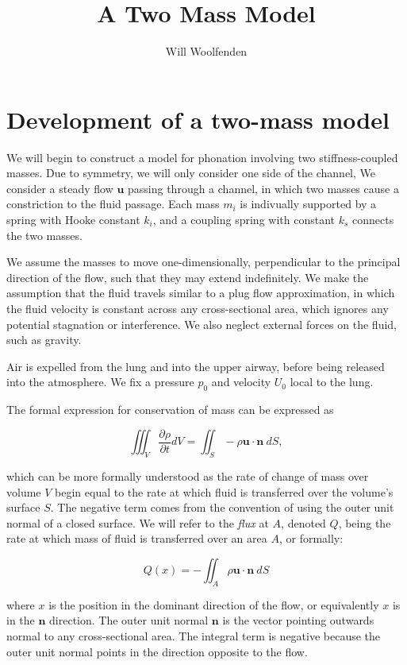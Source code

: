 \documentclass{article}
\begin{document}
\title{A Two Mass Model}
\author{Will Woolfenden}

\section{Development of a two-mass model}

We will begin to construct a model for phonation involving two stiffness-coupled masses.
Due to symmetry, we will only consider one side of the channel, 
We consider a steady flow $\mathbf{u}$ passing through a channel,
in which two masses cause a constriction to the fluid passage.
Each mass $m_i$ is indivually supported by a spring with Hooke constant $k_i$,
and a coupling spring with constant $k_s$ connects the two masses.

We assume the masses to move one-dimensionally, perpendicular to the principal direction of the flow,
such that they may extend indefinitely.
We make the assumption that the fluid travels similar to a plug flow approximation,
in which the fluid velocity is constant across any cross-sectional area, %
which ignores any potential stagnation or interference.
We also neglect external forces on the fluid, such as gravity.

Air is expelled from the lung and into the upper airway, before being released into the atmosphere.
We fix a pressure $p_0$ and velocity $U_0$ local to the lung.

The formal expression for conservation of mass can be expressed as

\begin{equation}
    \iiint_V \frac{\partial\rho}{\partial t}dV = \iint_S -\rho \bm{u\cdot n}~dS,
    \label{eqn:cons_mass_formal}
\end{equation}

which can be more formally understood as the rate of change of mass over volume $V$ begin equal to the rate at which fluid is transferred over the volume's surface $S$. 
The negative term comes from the convention of using the outer unit normal of a closed surface.
We will refer to the \textit{flux} at $A$, denoted $Q$, being the rate at which mass of fluid is transferred over an area $A$, or formally:

\begin{equation}
    Q(x) = -\iint_A \rho \bm{u \cdot n}~dS
\end{equation}

where $x$ is the position in the dominant direction of the flow, or equivalently $x$ is in the $\mathbf{n}$ direction.
The outer unit normal $\mathbf{n}$ is the vector pointing outwards normal to any cross-sectional area. 
The integral term is negative because the outer unit normal points in the direction opposite to the flow.
\end{document}

